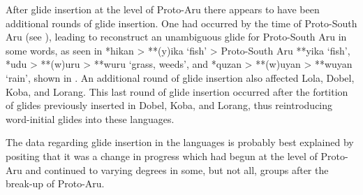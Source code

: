 After glide insertion at the level of Proto-Aru there appears
to have been additional rounds of glide insertion.
One had occurred by the time of Proto-South Aru (see ),
leading \citet{Nivens2017} to reconstruct an unambiguous glide
for Proto-South Aru in some words,
as seen in *hikan > **(y)ika ‘fish’ > Proto-South Aru **yika
‘fish’, *udu > **(w)uru > **wuru ‘grass,
weeds’, and *quzan > **(w)uyan > **wuyan ‘rain’,
shown in .
An additional round of glide insertion also
affected Lola, Dobel, Koba, and Lorang.
This last round of glide insertion occurred after the fortition
of glides previously inserted in Dobel,
Koba, and Lorang, thus reintroducing word-initial glides into these languages.

The data regarding glide insertion in the  languages
is probably best explained by positing that it was a change in
progress which had begun at the level of Proto-Aru
and continued to varying degrees in some,
but not all, groups after the break-up of Proto-Aru.
